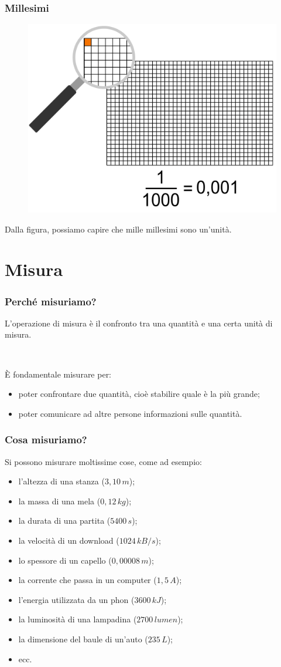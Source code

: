 \documentclass[handout]{beamer}
\theoremstyle{plain}
\begin{document}
\begin{frame}
\frametitle{Millesimi}
\begin{figure}
  \includegraphics[width=.6\columnwidth]{img/millesimi1.png}
\end{figure}    

Dalla figura, possiamo capire che \alert{mille millesimi sono un'unità}.
\end{frame}



\section{Misura}


\begin{frame}
\frametitle{Perché misuriamo?}
L'operazione di misura è il confronto tra una quantità e una certa \alert{unità di misura}.\pause

~

È fondamentale misurare per:
\begin{itemize}
  \item poter \alert{confrontare} due quantità, cioè stabilire quale è la più grande;\pause
  \item poter \alert{comunicare} ad altre persone informazioni sulle quantità.
\end{itemize}
\end{frame}



\begin{frame}
\frametitle{Cosa misuriamo?}
Si possono misurare moltissime cose, come ad esempio:
\begin{itemize}
  \item l'altezza di una stanza ($  3,10 \, m $);
  \item la massa di una mela ($ 0,12  \, kg $);
  \item la durata di una partita ($  5400 \, s $);
  \item la velocità di un download ($  1024 \, kB/s $);
  \item lo spessore di un capello ($  0,00008 \, m $);
  \item la corrente che passa in un computer ($  1,5 \, A $);
  \item l'energia utilizzata da un phon ($ 3600  \, kJ $);
  \item la luminosità di una lampadina ($  2700 \, lumen $);
  \item la dimensione del baule di un'auto ($  235 \, L $);
  \item ecc.
\end{itemize}
\end{frame}
\end{document}

